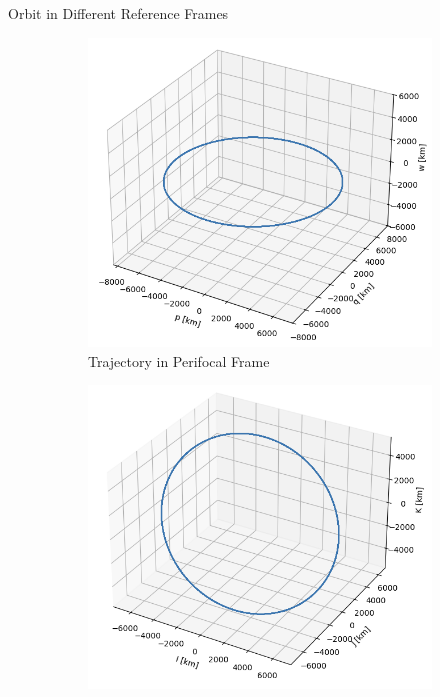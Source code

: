 \begin{hwkProblem}{2}{Orbit in Different Reference Frames}
	\begin{figure}[H] \label{fig:s02a}
		\begin{center}
			\begin{subfigure}{0.3\textwidth} \label{fig:s02a1}
				\includegraphics[width=\linewidth]{./images/s02a1.png}
				\caption{Trajectory in Perifocal Frame}
			\end{subfigure}
			\hfill
			\begin{subfigure}{0.3\textwidth} \label{fig:s02a2}
				\includegraphics[width=\linewidth]{./images/s02a2.png}

\end{subfigure}
\end{center}
\end{figure}
\end{hwkProblem}
